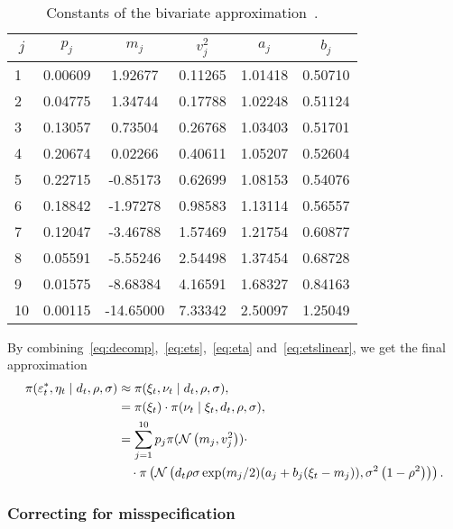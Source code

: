 \begin{table}[h!]
	\centering
	\caption{Constants of the bivariate approximation~\citep{Omori2007}.}
	\label{tab:constants}
	\begin{tabular}{cccccc}
		$j$                       & $p_j$    & $m_j$      & $v_j^2$ & $a_j$    & $b_j$    \\ \hline
		\multicolumn{1}{l|}{1}  & 0.00609 & 1.92677   & 0.11265                & 1.01418 & 0.50710 \\
		\multicolumn{1}{l|}{2}  & 0.04775 & 1.34744   & 0.17788                & 1.02248 & 0.51124 \\
		\multicolumn{1}{l|}{3}  & 0.13057 & 0.73504   & 0.26768                & 1.03403 & 0.51701 \\
		\multicolumn{1}{l|}{4}  & 0.20674 & 0.02266   & 0.40611                & 1.05207 & 0.52604 \\
		\multicolumn{1}{l|}{5}  & 0.22715 & -0.85173  & 0.62699                & 1.08153 & 0.54076 \\
		\multicolumn{1}{l|}{6}  & 0.18842 & -1.97278  & 0.98583                & 1.13114 & 0.56557 \\
		\multicolumn{1}{l|}{7}  & 0.12047 & -3.46788  & 1.57469                & 1.21754 & 0.60877 \\
		\multicolumn{1}{l|}{8}  & 0.05591 & -5.55246  & 2.54498                & 1.37454 & 0.68728 \\
		\multicolumn{1}{l|}{9}  & 0.01575 & -8.68384  & 4.16591                & 1.68327 & 0.84163 \\
		\multicolumn{1}{l|}{10} & 0.00115 & -14.65000 & 7.33342                & 2.50097 & 1.25049
	\end{tabular}
\end{table}

By combining~\eqref{eq:decomp},~\eqref{eq:ets},~\eqref{eq:eta} and~\eqref{eq:etslinear}, we get the final approximation
\begin{align*}
\pi(\varepsilon_t^\ast,\eta_t\mid d_t,\rho,\sigma) &\approx \pi(\xi_t,\nu_t\mid d_t,\rho,\sigma), \\
&= \pi(\xi_t)\cdot \pi(\nu_t\mid\xi_t,d_t,\rho,\sigma), \\
&= \sum_{j=1}^{10}p_j\pi(\mathcal{N}\left(m_j,v_j^2\right))\cdot \\
&\quad\cdot\pi\left(\mathcal{N}\left(d_t\rho\sigma\exp(m_j/2)(a_j+b_j(\xi_t-m_j)),\sigma^2\left(1-\rho^2\right)\right)\right).
\end{align*}

\subsubsection{Correcting for misspecification}\label{sec:reweight}

